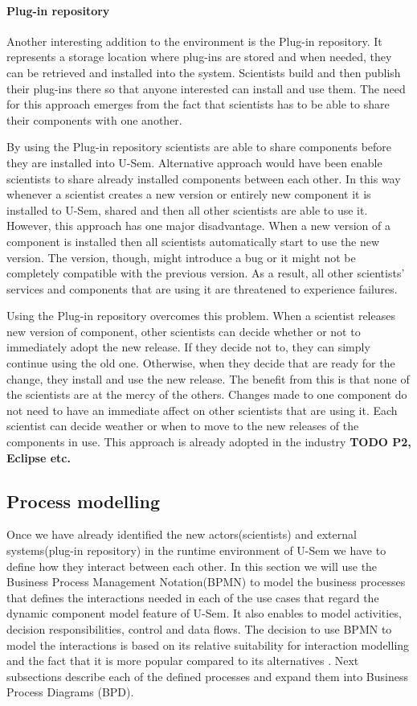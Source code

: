 \paragraph{Plug-in repository}
Another interesting addition to the environment is the Plug-in repository. It represents a storage location where plug-ins are stored and when needed, they can be retrieved and installed into the system. Scientists build and then publish their plug-ins there so that anyone interested can install and use them. The need for this approach emerges from the fact that scientists has to be able to share their components with one another.

By using the Plug-in repository scientists are able to share components before they are installed into U-Sem. Alternative approach would have been enable scientists to share already installed components between each other. In this way whenever a scientist creates a new version or entirely new component it is installed to U-Sem, shared and then all other scientists are able to use it. However, this approach has one major disadvantage. When a new version of a component is installed then all scientists automatically start to use the new version. The version, though, might introduce a bug or it might not be completely compatible with the previous version. As a result, all other scientists' services and components that are using it are threatened to experience failures. 

Using the Plug-in repository overcomes this problem. When a scientist releases new version of component, other scientists can decide whether or not to immediately adopt the new release. If they decide not to, they can simply continue using the old one. Otherwise, when they decide that are ready for the change, they install and use the new release. The benefit from this is that none of the scientists are at the mercy of the others. Changes made to one component do not need to have an immediate affect on other scientists that are using it. Each scientist can decide weather or when to move to the new releases of the components in use. This approach is already adopted in the industry \textbf{TODO P2, Eclipse etc.}


\subsection{Process modelling}

Once we have already identified the new actors(scientists) and external systems(plug-in repository) in the runtime environment of U-Sem we have to define how they interact between each other. In this section we will use the Business Process Management Notation(BPMN) \cite{BPMN} to model the business processes that defines the interactions needed in each of the use cases that regard the dynamic component model feature of U-Sem. It also enables to model activities, decision responsibilities, control and data flows. The decision to use BPMN to model the interactions is based on its relative suitability for interaction modelling and the fact that it is more popular compared to its alternatives \cite{Decker}. Next subsections describe each of the defined processes and expand them into Business Process Diagrams (BPD).

